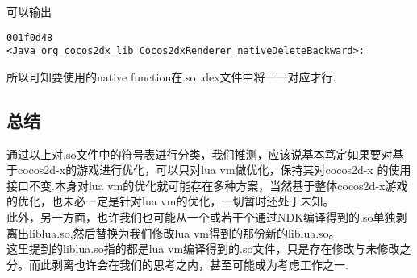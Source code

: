 可以输出
\begin{lstlisting}
001f0d48 <Java_org_cocos2dx_lib_Cocos2dxRenderer_nativeDeleteBackward>:
\end{lstlisting}
所以可知要使用的native function在.so .dex文件中将一一对应才行.\\


\subsection{总结}
通过以上对.so文件中的符号表进行分类，我们推测，应该说基本笃定如果要对基于cocos2d-x的游戏进行优化，可以只对lua vm做优化，保持其对cocos2d-x
的使用接口不变.本身对lua vm的优化就可能存在多种方案，当然基于整体cocos2d-x游戏的优化，也未必一定是针对lua vm的优化，一切暂时还处于未知。\\

此外，另一方面，也许我们也可能从一个或若干个通过NDK编译得到的.so单独剥离出liblua.so,然后替换为我们修改lua vm得到的那份新的liblua.so。\\
这里提到的liblua.so指的都是lua vm编译得到的.so文件，只是存在修改与未修改之分。而此剥离也许会在我们的思考之内，甚至可能成为考虑工作之一.\\













